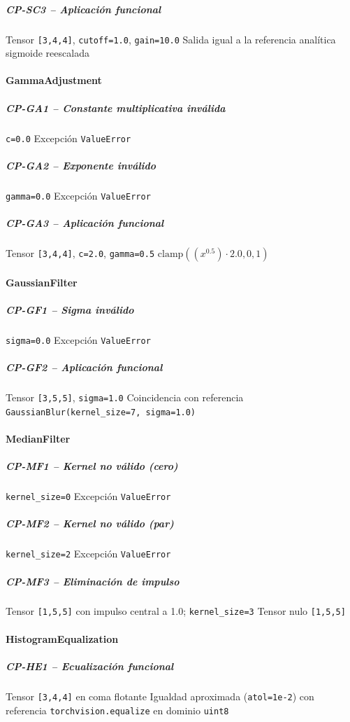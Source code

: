 \subparagraph{CP-SC3 -- Aplicación funcional}\label{cp:CP-SC3}
\testcasetable
{Tensor \texttt{[3,4,4]}, \texttt{cutoff=1.0}, \texttt{gain=10.0}}
{Salida igual a la referencia analítica sigmoide reescalada}

\paragraph{GammaAdjustment}
\subparagraph{CP-GA1 -- Constante multiplicativa inválida}\label{cp:CP-GA1}
\testcasetable
{\texttt{c=0.0}}
{Excepción \texttt{ValueError}}

\subparagraph{CP-GA2 -- Exponente inválido}\label{cp:CP-GA2}
\testcasetable
{\texttt{gamma=0.0}}
{Excepción \texttt{ValueError}}

\subparagraph{CP-GA3 -- Aplicación funcional}\label{cp:CP-GA3}
\testcasetable
{Tensor \texttt{[3,4,4]}, \texttt{c=2.0}, \texttt{gamma=0.5}}
{$\mathrm{clamp}((x^{0.5})\cdot 2.0, 0, 1)$}

\paragraph{GaussianFilter}
\subparagraph{CP-GF1 -- Sigma inválido}\label{cp:CP-GF1}
\testcasetable
{\texttt{sigma=0.0}}
{Excepción \texttt{ValueError}}

\subparagraph{CP-GF2 -- Aplicación funcional}\label{cp:CP-GF2}
\testcasetable
{Tensor \texttt{[3,5,5]}, \texttt{sigma=1.0}}
{Coincidencia con referencia \texttt{GaussianBlur(kernel\_size=7, sigma=1.0)}}

\paragraph{MedianFilter}
\subparagraph{CP-MF1 -- Kernel no válido (cero)}\label{cp:CP-MF1}
\testcasetable
{\texttt{kernel\_size=0}}
{Excepción \texttt{ValueError}}

\subparagraph{CP-MF2 -- Kernel no válido (par)}\label{cp:CP-MF2}
\testcasetable
{\texttt{kernel\_size=2}}
{Excepción \texttt{ValueError}}

\subparagraph{CP-MF3 -- Eliminación de impulso}\label{cp:CP-MF3}
\testcasetable
{Tensor \texttt{[1,5,5]} con impulso central a 1.0; \texttt{kernel\_size=3}}
{Tensor nulo \texttt{[1,5,5]}}

\paragraph{HistogramEqualization}
\subparagraph{CP-HE1 -- Ecualización funcional}\label{cp:CP-HE1}
\testcasetable
{Tensor \texttt{[3,4,4]} en coma flotante}
{Igualdad aproximada (\texttt{atol=1e-2}) con referencia \texttt{torchvision.equalize} en dominio \texttt{uint8}}


